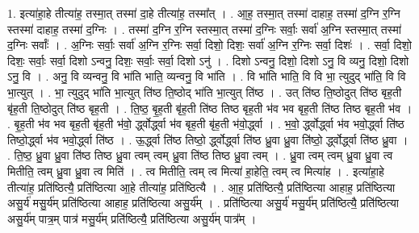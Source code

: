 \documentclass[17pt]{extarticle}
\begin{document}
1. इत्या॑हा॒हे तीत्या॑ह॒ तस्मा॒त् तस्मा॑ दा॒हे तीत्या॑ह॒ तस्मा᳚त् । . आ॒ह॒ तस्मा॒त् तस्मा॑ दाहाह॒ तस्मा॑ द॒ग्नि र॒ग्नि स्तस्मा॑ दाहाह॒ तस्मा॑ द॒ग्निः । . तस्मा॑ द॒ग्नि र॒ग्नि स्तस्मा॒त् तस्मा॑ द॒ग्निः सर्वाः॒ सर्वा॑ अ॒ग्नि स्तस्मा॒त् तस्मा॑ द॒ग्निः सर्वाः᳚ । . अ॒ग्निः सर्वाः॒ सर्वा॑ अ॒ग्नि र॒ग्निः सर्वा॒ दिशो॒ दिशः॒ सर्वा॑ अ॒ग्नि र॒ग्निः सर्वा॒ दिशः॑ । . सर्वा॒ दिशो॒ दिशः॒ सर्वाः॒ सर्वा॒ दिशो ऽन्वनु॒ दिशः॒ सर्वाः॒ सर्वा॒ दिशो ऽनु॑ । . दिशो ऽन्वनु॒ दिशो॒ दिशो ऽनु॒ वि व्यनु॒ दिशो॒ दिशो ऽनु॒ वि । . अनु॒ वि व्यन्वनु॒ वि भा॑ति भाति॒ व्यन्वनु॒ वि भा॑ति । . वि भा॑ति भाति॒ वि वि भा॒ त्युदुद् भा॑ति॒ वि वि भा॒त्युत् । . भा॒ त्युदुद् भा॑ति भा॒त्युत् ति॑ष्ठ ति॒ष्ठोद् भा॑ति भा॒त्युत् ति॑ष्ठ । . उत् ति॑ष्ठ ति॒ष्ठोदुत् ति॑ष्ठ बृह॒ती बृ॑ह॒ती ति॒ष्ठोदुत् ति॑ष्ठ बृह॒ती । . ति॒ष्ठ॒ बृ॒ह॒ती बृ॑ह॒ती ति॑ष्ठ तिष्ठ बृह॒ती भ॑व भव बृह॒ती ति॑ष्ठ तिष्ठ बृह॒ती भ॑व । . बृ॒ह॒ती भ॑व भव बृह॒ती बृ॑ह॒ती भ॑वो॒ र्द्ध्वोर्द्ध्वा भ॑व बृह॒ती बृ॑ह॒ती भ॑वो॒र्द्ध्वा । . भ॒वो॒ र्द्ध्वोर्द्ध्वा भ॑व भवो॒र्द्ध्वा ति॑ष्ठ तिष्ठो॒र्द्ध्वा भ॑व भवो॒र्द्ध्वा ति॑ष्ठ । . ऊ॒र्द्ध्वा ति॑ष्ठ तिष्ठो॒ र्द्ध्वोर्द्ध्वा ति॑ष्ठ ध्रु॒वा ध्रु॒वा ति॑ष्ठो॒ र्द्ध्वोर्द्ध्वा ति॑ष्ठ ध्रु॒वा । . ति॒ष्ठ॒ ध्रु॒वा ध्रु॒वा ति॑ष्ठ तिष्ठ ध्रु॒वा त्वम् त्वम् ध्रु॒वा ति॑ष्ठ तिष्ठ ध्रु॒वा त्वम् । . ध्रु॒वा त्वम् त्वम् ध्रु॒वा ध्रु॒वा त्व मितीति॒ त्वम् ध्रु॒वा ध्रु॒वा त्व मिति॑ । . त्व मितीति॒ त्वम् त्व मित्या॑ हा॒हेति॒ त्वम् त्व मित्या॑ह । . इत्या॑हा॒हे तीत्या॑ह॒ प्रति॑ष्ठित्यै॒ प्रति॑ष्ठित्या आ॒हे तीत्या॑ह॒ प्रति॑ष्ठित्यै । . आ॒ह॒ प्रति॑ष्ठित्यै॒ प्रति॑ष्ठित्या आहाह॒ प्रति॑ष्ठित्या असु॒र्य॑ मसु॒र्य॑म् प्रति॑ष्ठित्या आहाह॒ प्रति॑ष्ठित्या असु॒र्य᳚म् । . प्रति॑ष्ठित्या असु॒र्य॑ मसु॒र्य॑म् प्रति॑ष्ठित्यै॒ प्रति॑ष्ठित्या असु॒र्य॑म् पात्र॒म् पात्र॑ मसु॒र्य॑म् प्रति॑ष्ठित्यै॒ प्रति॑ष्ठित्या असु॒र्य॑म् पात्र᳚म् । \newline
\end{document}
